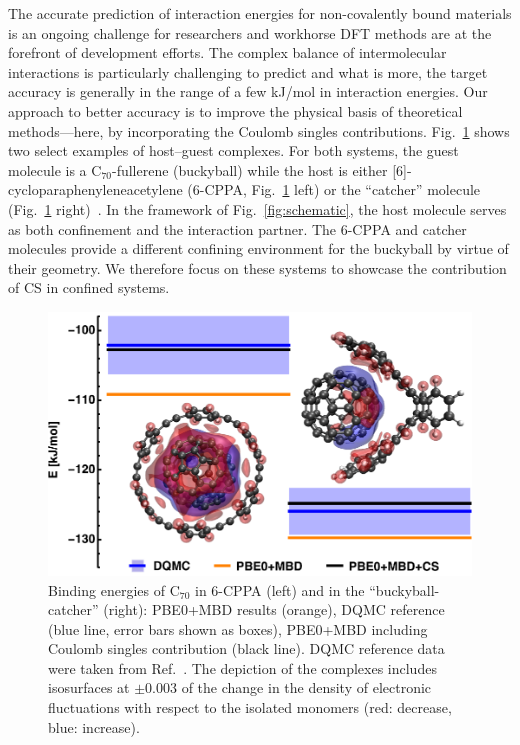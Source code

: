 \documentclass[aps,prl,groupaddress, twocolumn]{revtex4-1}  %
\begin{document}
The accurate prediction of interaction energies for non-covalently bound materials is an ongoing challenge for researchers and workhorse DFT methods are at the forefront of development efforts. The complex balance of intermolecular interactions is particularly challenging to predict and what is more, the target accuracy is generally in the range of a few kJ/mol in interaction energies. Our approach to better accuracy is to improve the physical basis of theoretical methods---here, by incorporating the Coulomb singles contributions.
Fig.~\ref{fig:flagshipsystems} shows two select examples of host--guest complexes. For both systems, the guest molecule is a C$_{70}$-fullerene (buckyball) while the host is either [6]-cycloparaphenyleneacetylene (6-CPPA, Fig.~\ref{fig:flagshipsystems} left) or the ``catcher'' molecule (Fig.~\ref{fig:flagshipsystems} right)~\cite{s12l_2013}. In the framework of Fig.~\ref{fig:schematic}, the host molecule serves as both confinement and the interaction partner. The 6-CPPA and catcher molecules provide a different confining environment for the buckyball by virtue of their geometry. We therefore focus on these systems to showcase the contribution of CS in confined systems.
\begin{figure}[htp!]
\centering
\includegraphics[scale=0.68]{Plots/S12L4b.eps}
\caption{Binding energies of C$_{70}$ in 6-CPPA (left) and in the ``buckyball-catcher'' (right):
PBE0+MBD results (orange), DQMC reference (blue line, error bars shown as boxes), PBE0+MBD including Coulomb singles contribution (black line).
DQMC reference data were taken from Ref.~\cite{hermann_ncomm2017}.
The depiction of the complexes includes isosurfaces at $\pm$0.003 of the change in the density of electronic fluctuations with respect to the isolated monomers (red: decrease, blue: increase).
}\label{fig:flagshipsystems}
\end{figure}
\end{document}
